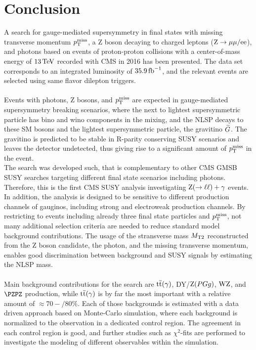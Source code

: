 \chapter{Conclusion}\label{chap:conclusion}

A search for gauge-mediated supersymmetry in final states with missing transverse momentum $p_{\mathrm{T}}^\text{miss}$, a Z boson decaying to charged leptons ($\mathrm{Z}\to{\mu}\mu/\mathrm{e}\mathrm{e}$), and photons based on events of proton-proton collisions with a center-of-mass energy of $13\,\text{Te\hspace{-.08em}V}$ recorded with CMS in 2016 has been presented. The data set corresponds to an integrated luminosity of $35.9\mbox{\ensuremath{\,\text{fb}^\text{$-$1}}}$, and the relevant events are selected using same flavor dilepton triggers.\\\\
Events with photons, Z bosons, and $p_{\mathrm{T}}^\text{miss}$ are expected in gauge-mediated supersymmetry breaking scenarios, where the next to lightest supersymmetric particle has bino and wino components in the mixing, and the NLSP decays to these SM bosons and the lightest supersymmetric particle, the gravitino $\widetilde{G}$. The gravitino is predicted to be stable in R-parity conserving SUSY scenarios and leaves the detector undetected, thus giving rise to a significant amount of $p_{\mathrm{T}}^\text{miss}$ in the event.\\
The search was developed such, that is complementary to other CMS GMSB SUSY searches targeting different final state scenarios including photons. Therefore, this is the first CMS SUSY analysis investigating $\mathrm{Z}(\to\ell\ell)+\gamma$ events. In addition, the analysis is designed to be sensitive to different production channels of gauginos, including strong and electroweak production channels. By restricting to events including already three final state particles and $p_{\mathrm{T}}^\text{miss}$, not many additional selection criteria are needed to reduce standard model background contributions. The usage of the stransverse mass $M_{\mathrm{T2}}$ reconstructed from the Z boson candidate, the photon, and the missing transverse momentum, enables good discrimination between background and SUSY signals by estimating the NLSP mass.\\\\
Main background contributions for the search are ${\mathrm{t}\overline{\mathrm{t}}}(\gamma)$, DY/$\mathrm{Z}(PGg)$, $\mathrm{W}\mathrm{Z}$, and $\PZPZ$ production, while ${\mathrm{t}\overline{\mathrm{t}}}(\gamma)$ is by far the most important with a relative amount of $\approx70-/80\%$. Each of those backgrounds is estimated with a data driven approach based on Monte-Carlo simulation, where each background is normalized to the observation in a dedicated control region. The agreement in each control region is good, and further studies such as $\chi^2$-fits are performed to investigate the modeling of different observables within the simulation.\\
